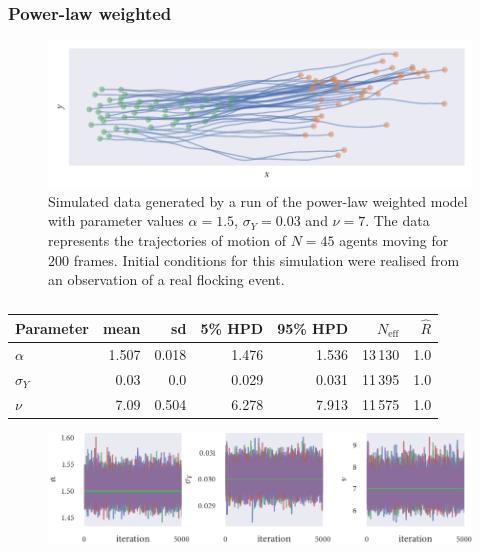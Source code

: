 \subsubsection{Power-law weighted}

\begin{figure}[h]
    \includegraphics{power_sim.pdf}
    \caption{Simulated data generated by a run of the power-law weighted model with
    parameter values $\alpha=1.5$, $\sigma_Y=0.03$ and $\nu=7$. The data represents the
    trajectories of motion of $N=45$ agents moving for $200$ frames. Initial conditions
    for this simulation were realised from an observation of a real flocking event.}
\end{figure}

\begin{table}[tb]
\begin{tabular}{@{}lrrrrrr@{}}
\toprule
Parameter &  mean &    sd & 5\% HPD & 95\% HPD & $N_{\textrm{eff}}$ & $\hat{R}$ \\
\midrule
$\alpha$ & 1.507 & 0.018 &   1.476 &    1.536 &            13\,130 &       1.0 \\
$\sigma_{Y}$ & 0.03 & 0.0 &   0.029 &    0.031 &            11\,395 &       1.0 \\
$\nu$ & 7.09 & 0.504 &   6.278 &    7.913 &            11\,575 &       1.0 \\
\bottomrule
\end{tabular}
\caption{}
\end{table}

\begin{figure}[tb]
    \includegraphics{stan_power_trace.pdf}
    \caption{}
\end{figure}

